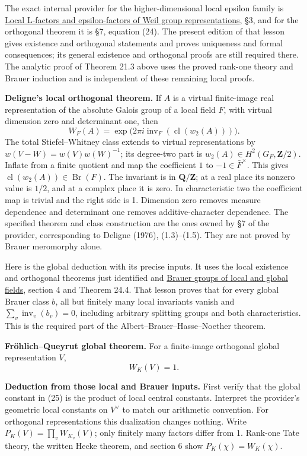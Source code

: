 \documentclass[11pt,a4paper]{article}
\begin{document}
The exact internal provider for the higher-dimensional local epsilon
family is
\href{https://kokunoyumeto.github.io/open-math-courses/courses/NT-CFT/proof-dependencies.html\#LG-GAL-06}{Local
L-factors and epsilon-factors of Weil group representations}, §3, and
for the orthogonal theorem it is §7, equation (24). The present edition
of that lesson gives existence and orthogonal statements and proves
uniqueness and formal consequences; its general existence and orthogonal
proofs are still required there. The analytic proof of Theorem 21.3
above uses the proved rank-one theory and Brauer induction and is
independent of these remaining local proofs.

\textbf{Deligne's local orthogonal theorem.} If \(A\) is a virtual
finite-image real representation of the absolute Galois group of a local
field \(F\), with virtual dimension zero and determinant one, then \[
W_F(A)=\exp\bigl(2\pi i\operatorname{inv}_F(\operatorname{cl}(w_2(A)))\bigr).
\tag{41}
\] The total Stiefel--Whitney class extends to virtual representations
by \(w(V-W)=w(V)w(W)^{-1}\); its degree-two part is
\(w_2(A)\in H^2(G_F,\mathbf Z/2)\). Inflate from a finite quotient and
map the coefficient \(1\) to \(-1\in\bar F^\times\). This gives
\(\operatorname{cl}(w_2(A))\in\operatorname{Br}(F)\). The invariant is
in \(\mathbf Q/\mathbf Z\); at a real place its nonzero value is
\(1/2\), and at a complex place it is zero. In characteristic two the
coefficient map is trivial and the right side is 1. Dimension zero
removes measure dependence and determinant one removes
additive-character dependence. The specified theorem and class
construction are the ones owned by §7 of the provider, corresponding to
Deligne (1976), (1.3)--(1.5). They are not proved by Brauer meromorphy
alone.

Here is the global deduction with its precise inputs. It uses the local
existence and orthogonal theorems just identified and
\href{../brauer-groups-of-local-and-global-fields.html}{Brauer groups of
local and global fields}, section 4 and Theorem 24.4. That lesson proves
that for every global Brauer class \(b\), all but finitely many local
invariants vanish and \(\sum_v\operatorname{inv}_v(b_v)=0\), including
arbitrary splitting groups and both characteristics. This is the
required part of the Albert--Brauer--Hasse--Noether theorem.

\textbf{Fröhlich--Queyrut global theorem.} For a finite-image orthogonal
global representation \(V\), \[
W_K(V)=1.
\tag{42}
\]

\textbf{Deduction from those local and Brauer inputs.} First verify that
the global constant in (25) is the product of local central constants.
Interpret the provider's geometric local constants on \(V^\vee\) to
match our arithmetic convention. For orthogonal representations this
dualization changes nothing. Write \(P_K(V)=\prod_v W_{K_v}(V)\); only
finitely many factors differ from 1. Rank-one Tate theory, the written
Hecke theorem, and section 6 show \(P_K(\chi)=W_K(\chi)\).
\end{document}
